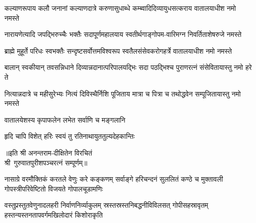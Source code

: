 
\twolineshloka
{कल्याणरूपाय कलौ जनानां कल्याणदात्रे करुणासुधाब्धे}
{कम्ब्वादिदिव्यायुधसत्कराय वातालयाधीश नमो नमस्ते}

\twolineshloka
{नारायणेत्यादि जपद्भिरुच्चैः भक्तैः सदापूर्णमहालयाय}
{स्वतीर्थगाङ्गोपम-वारिमग्न निवर्तिताशेषरुजे नमस्ते}

\twolineshloka
{ब्राह्मे मुहूर्ते परिधः स्वभक्तैः सन्दृष्टसर्वोत्तमविश्वरूप}
{स्वतैलसंसेवकरोगहर्त्रे वातालयाधीश नमो नमस्ते}

\twolineshloka
{बालान् स्वकीयान् तवसन्निधाने दिव्यान्नदानात्परिपालयद्भिः}
{सदा पठद्भिश्च पुराणरत्नं संसेवितायास्तु नमो हरे ते}

\twolineshloka
{नित्यान्नदात्रे च महीसुरेभ्यः नित्यं दिविस्थैर्निशि पूजिताय}
{मात्रा च पित्रा च तथोद्धवेन सम्पूजितायास्तु नमो नमस्ते}

{वातालयेशस्य कृपाफलेन लभेत सर्वाणि च मङ्गलानि}

{हृदि चापि विशेत् हरिः स्वयं तु रतिनाथायुततुल्यदेहकान्तिः}

॥इति श्री अनन्तराम-दीक्षितेन विरचितं\\ श्री~गुरुवातपुरीशपञ्चरत्नं सम्पूर्णम्‌॥

\closesection
\setlength{\shlokaspaceskip}{6pt}
{नासाग्रे वरमौक्तिकं करतले वेणुः करे कङ्कणम्}
{सर्वाङ्गे हरिचन्दनं सुललितं कण्ठे च मुक्तावली}
{गोपस्त्रीपरिवेष्टितो विजयते गोपालचूडामणिः}

{वस्तुप्रस्तुतवेणुनादलहरी निर्वाणनिर्व्याकुलम्}
{स्रस्तस्रस्तनिबद्धनीविविलसत् गोपीसहस्रावृतम्}
{हस्तन्यस्तनतापवर्गमखिलोदारं किशोराकृति}


\setlength{\shlokaspaceskip}{24pt}